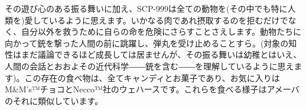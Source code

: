 \documentclass[10pt,a4paper]{jarticle}
\begin{document}
その遊び心のある振る舞いに加え、SCP-999は全ての動物を(その中でも特に人類を)愛しているように思えます。いかなる肉であれ摂取するのを拒むだけでなく、自分以外を救うために自らの命を危険にさらすことさえします。動物たちに向かって銃を撃った人間の前に跳躍し、弾丸を受け止めることすら。(対象の知性はまだ議論できるほど成長しては居ませんが、その振る舞いは幼稚とはいえ、人間の会話とおおよその近代科学――銃を含む――を理解しているように思えます)。この存在の食べ物は、全てキャンディとお菓子であり、お気に入りはM\&M's™チョコとNecco™社のウェハースです。これらを食べる様子はアメーバのそれに類似しています。

\vspace{\fill}
\footerEN
\end{document}
